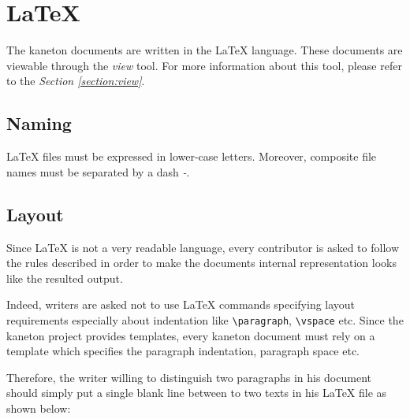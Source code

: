 %
%
%
%
%
%

%
%

\section{\LaTeX}
\label{section:latex}

The kaneton documents are written in the {\LaTeX} language. These documents
are viewable through the \textit{view} tool. For more information about
this tool, please refer to the \textit{Section \ref{section:view}}.

%
%

\subsection{Naming}

{\LaTeX} files must be expressed in lower-case letters. Moreover,
composite file names must be separated by a dash \textit{-}.

%
%

\subsection{Layout}

Since {\LaTeX} is not a very readable language, every contributor
is asked to follow the rules described in order to make the documents
internal representation looks like the resulted output.

Indeed, writers are asked not to use {\LaTeX} commands specifying
layout requirements especially about indentation like \verb|\paragraph|,
\verb|\vspace| etc. Since the kaneton project provides templates, every
kaneton document must rely on a template which specifies the paragraph
indentation, paragraph space etc.

Therefore, the writer willing to distinguish two paragraphs in his
document should simply put a single blank line between to two texts
in his {\LaTeX} file as shown below:

